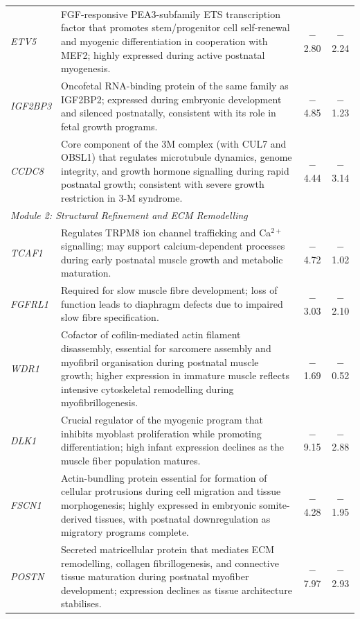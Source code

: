 \documentclass[10pt,a4paper]{article}
\begin{document}
\begin{landscape}
\begin{table}[p]
\begin{tabularx}{\linewidth}{lXcc}
    \textit{ETV5} & FGF-responsive PEA3-subfamily ETS transcription factor that promotes stem/progenitor cell self-renewal and myogenic differentiation in cooperation with MEF2; highly expressed during active postnatal myogenesis\cite{taylor_role_1997}. & $-$2.80 & $-$2.24 \\
    \textit{IGF2BP3} & Oncofetal RNA-binding protein of the same family as IGF2BP2; expressed during embryonic development and silenced postnatally, consistent with its role in fetal growth programs. & $-$4.85 & $-$1.23 \\
    \textit{CCDC8} & Core component of the 3M complex (with CUL7 and OBSL1) that regulates microtubule dynamics, genome integrity, and growth hormone signalling during rapid postnatal growth; consistent with severe growth restriction in 3-M syndrome\cite{hanson_exome_2011}. & $-$4.44 & $-$3.14 \\
    \midrule
    \multicolumn{4}{l}{\textit{Module 2: Structural Refinement and ECM Remodelling}} \\
    \textit{TCAF1} & Regulates TRPM8 ion channel trafficking and Ca$^{2+}$ signalling; may support calcium-dependent processes during early postnatal muscle growth and metabolic maturation\cite{gkika_trp_2015}. & $-$4.72 & $-$1.02 \\
    \textit{FGFRL1} & Required for slow muscle fibre development; loss of function leads to diaphragm defects due to impaired slow fibre specification\cite{amann_fgfrl1_2014}. & $-$3.03 & $-$2.10 \\
    \textit{WDR1} & Cofactor of cofilin-mediated actin filament disassembly, essential for sarcomere assembly and myofibril organisation during postnatal muscle growth; higher expression in immature muscle reflects intensive cytoskeletal remodelling during myofibrillogenesis\cite{ono_functions_2018}. & $-$1.69 & $-$0.52 \\
    \textit{DLK1} & Crucial regulator of the myogenic program that inhibits myoblast proliferation while promoting differentiation; high infant expression declines as the muscle fiber population matures\cite{waddell_dlk1_2010,andersen_dual_2013}. & $-$9.15 & $-$2.88 \\
    \textit{FSCN1} & Actin-bundling protein essential for formation of cellular protrusions during cell migration and tissue morphogenesis; highly expressed in embryonic somite-derived tissues, with postnatal downregulation as migratory programs complete\cite{adams_roles_2004}. & $-$4.28 & $-$1.95 \\
    \textit{POSTN} & Secreted matricellular protein that mediates ECM remodelling, collagen fibrillogenesis, and connective tissue maturation during postnatal myofiber development; expression declines as tissue architecture stabilises\cite{ozdemir_periostin_2014}. & $-$7.97 & $-$2.93 \\

\end{tabularx}
\end{table}
\end{landscape}
\end{document}
